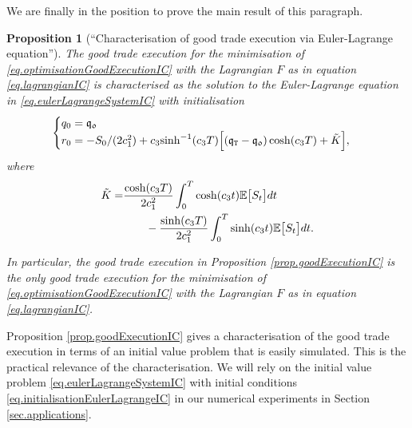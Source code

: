 \documentclass[10pt,a4paper]{article}
\newtheorem{prop}[thm]{Proposition}
\begin{document}
	We are finally in the position to prove the main result of this  paragraph. 
	\begin{prop}[``Characterisation of good trade execution via Euler-Lagrange equation''] \label{prop.eulerLagrangeCharacterisationIC}
		The good trade execution for the minimisation of \eqref{eq.optimisationGoodExecutionIC} with the Lagrangian $F$ as in equation \eqref{eq.lagrangianIC} is characterised as the solution to the Euler-Lagrange equation in \eqref{eq.eulerLagrangeSystemIC} with initialisation
		\begin{equation}\label{eq.initialisationEulerLagrangeIC}
		\begin{cases}
		q_0 = \mathfrak{q_0} \\
		r_0 = - S_0 / (2c_{1}^{2}) + {c_{3}}{\sinh^{-1} (c_{3} T)}
					\Big[
						(\mathfrak{q}_{\mathtt{T} } - \mathfrak{q_0}) \cosh(c_{3}T) 
						+\tilde{K}
						\Big],
		\end{cases}
		\end{equation}
		where 
		\begin{equation*}
		\begin{split}
		\tilde{K}=&\frac{\cosh(c_{3}T)}{2c_{1}^{2}}
		\int_{0}^{T} \cosh(c_{3} t) \mathbb{{E}} \big[S_t \big] dt \\
		&\qquad -\frac{\sinh(c_{3}T)}{2c_{1}^{2}}
		\int_{0}^{T} \sinh(c_{3} t) \mathbb{{E}} \big[S_t \big] dt.
		\end{split}
		\end{equation*}	
		
		In particular, the good trade execution in Proposition \ref{prop.goodExecutionIC} is the only good trade execution for the minimisation of \eqref{eq.optimisationGoodExecutionIC} with the Lagrangian $F$ as in equation \eqref{eq.lagrangianIC}.
	\end{prop}
	\begin{remark}
		Proposition \ref{prop.goodExecutionIC} gives a characterisation of the good trade execution in terms of an initial value problem that is easily simulated. This is the practical relevance of the characterisation. We will rely on the initial value problem \eqref{eq.eulerLagrangeSystemIC} with initial conditions \eqref{eq.initialisationEulerLagrangeIC} in our numerical experiments in Section \ref{sec.applications}.
	\end{remark}
\end{document}
